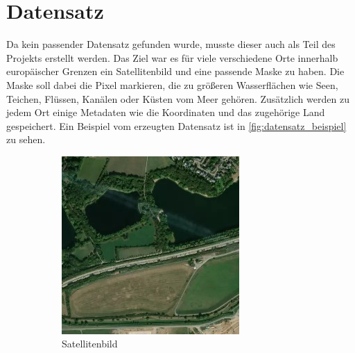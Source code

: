 \section{Datensatz}
\label{sec:Datensatz}

Da kein passender Datensatz gefunden wurde, musste dieser auch als Teil des Projekts erstellt werden.
Das Ziel war es für viele verschiedene Orte innerhalb europäischer Grenzen ein Satellitenbild und eine passende Maske zu haben.
Die Maske soll dabei die Pixel markieren, die zu größeren Wasserflächen wie Seen, Teichen, Flüssen, Kanälen oder Küsten vom Meer gehören.
Zusätzlich werden zu jedem Ort einige Metadaten wie die Koordinaten und das zugehörige Land gespeichert.
Ein Beispiel vom erzeugten Datensatz ist in \autoref{fig:datensatz_beispiel} zu sehen.

\begin{figure}
    \centering
    \begin{subfigure}{0.3\textwidth}
        \centering
        \includegraphics[width=\textwidth]{images/datensatz_beispiel_satellit.jpg}
        \caption{Satellitenbild}
        \label{fig:datensatz_beispiel_satellit}
    \end{subfigure}
    \begin{subfigure}{0.3\textwidth}
        \centering

\end{subfigure}
\end{figure}
